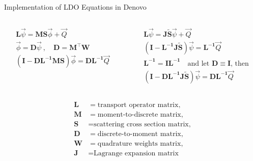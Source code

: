 \documentclass{beamer}
\newcommand{\ve}[1]{\ensuremath{\mathbf{#1}}}
\begin{document}
\begin{frame}{Implementation of LDO Equations in Denovo}
\begin{columns}[T]
\begin{column}{0.485\textwidth}
\begin{gather*}
\ve{L}\vec{\psi} = \ve{MS}\vec{\phi} + \vec{Q}\\
\vec{\phi} = \ve{D}\vec{\psi}\:, \quad \ve{D} = \ve{M}^\intercal\ve{W} \\
\left(\ve{I} - \ve{DL^{-1} MS}\right)\vec{\phi} = \ve{DL^{-1}}\vec{Q} 
\end{gather*}
\end{column}
\begin{column}{0.515\textwidth}
\begin{gather*}
\ve{L}\vec{\psi} = \ve{J\tilde{S}}\vec{\psi} + \vec{Q}\\
\left(\ve{I} - \ve{L^{-1} J\tilde{S}}\right)\vec{\psi} = \ve{L^{-1}}\vec{Q} \\ 
\ve{L^{-1}} = \ve{I}\ve{L^{-1}} \quad \text{and let } \ve{D} \equiv \ve{I} \text{, then} \nonumber\\
\left(\ve{I} - \ve{D L^{-1} J\tilde{S}}\right)\vec{\psi} = \ve{D L^{-1}}\vec{Q}
\end{gather*}
\end{column}
\end{columns}
\vspace{0.5em}
\begin{equation*}
  \begin{aligned}
    \ve{L} &= \text{transport operator matrix},\\
    \ve{M} &= \text{moment-to-discrete matrix},\\
    \ve{S} &= \text{scattering cross section matrix,}\\
    \ve{D} &= \text{discrete-to-moment matrix},\\
    \ve{W} &= \text{quadrature weights matrix},\\
    \ve{J} &= \text{Lagrange expansion matrix}
  \end{aligned}
\end{equation*}
\end{frame}
\end{document}
